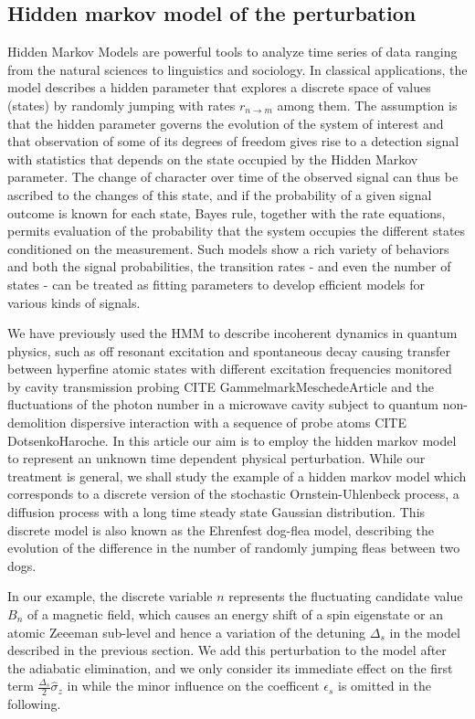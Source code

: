 \documentclass[aps,pra,twocolumn,groupedaddress,showpacs]{revtex4}
\begin{document}
\subsection{Hidden markov model of the perturbation}

Hidden Markov Models are powerful tools to analyze time series of data ranging from the natural sciences to linguistics and sociology. In classical applications, the model describes a hidden parameter that explores a discrete space of values (states) by randomly jumping with rates $r_{n\rightarrow m}$ among them. The assumption is that the hidden parameter governs the evolution of the system of interest and that observation of some of its degrees of freedom gives rise to a detection signal with statistics that depends on the state occupied by the Hidden Markov parameter. The change of character over time of the observed signal can thus be ascribed to the changes of this state, and if the probability of a given signal outcome is known for each state, Bayes rule, together with the rate equations, permits evaluation of the probability that the system occupies the different states conditioned on the measurement. Such models show a rich variety of behaviors and both the signal probabilities, the transition rates -  and even the number of states - can be treated as fitting parameters to develop efficient models for various kinds of signals.

We have previously used the HMM to describe incoherent dynamics in quantum physics, such as off resonant excitation and spontaneous decay causing transfer between hyperfine atomic states with different excitation frequencies monitored by cavity transmission probing CITE GammelmarkMeschedeArticle and the fluctuations of the photon number in a microwave cavity subject to quantum non-demolition dispersive interaction with a sequence of probe atoms CITE DotsenkoHaroche. In this article our aim is to employ the hidden markov model to represent an unknown time dependent physical perturbation. While our treatment is general, we shall study the example of a hidden markov model which corresponds to a discrete version of the stochastic Ornstein-Uhlenbeck process, a diffusion process with a long time steady state  Gaussian distribution. This discrete model is also known as the Ehrenfest dog-flea model, describing the evolution of the difference in the number of randomly jumping fleas between two dogs.

In our example, the discrete variable $n$ represents the fluctuating candidate value $B_n$ of a magnetic field, which causes an energy shift of a spin eigenstate or an atomic Zeeeman sub-level and hence a variation of the detuning $\Delta_s$ in the model described in the previous section. We add this perturbation to the model after the adiabatic elimination, and we only consider its immediate effect on the first term $\frac{\Delta_s}{2} \hat \sigma_z$ in \label{Hadel} while the minor influence on the coefficent $\epsilon_s$ is omitted in the following.
\end{document}
